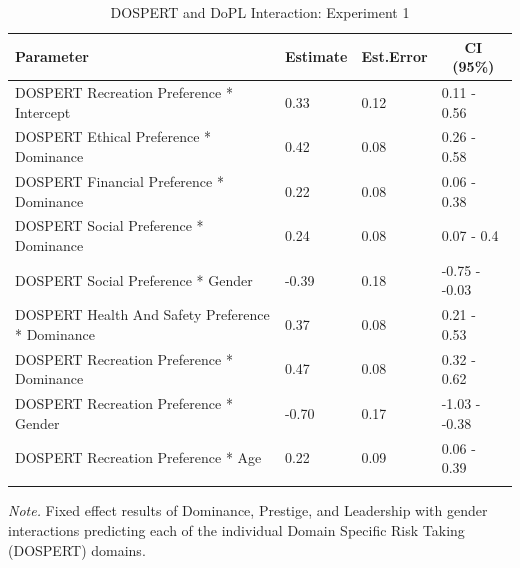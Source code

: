 \documentclass[
  donotrepeattitle,doc, 12pt, a4paper,floatsintext]{apa7}
\begin{document}
\begin{table}[ht]

\begin{center}
\begin{threeparttable}

\caption{\label{tab:m3_exp_1}DOSPERT and DoPL Interaction: Experiment 1}

\small{

\begin{tabular}{llll}
\toprule
Parameter & \multicolumn{1}{c}{Estimate} & \multicolumn{1}{c}{Est.Error} & \multicolumn{1}{c}{CI (95\%)}\\
\midrule
DOSPERT Recreation Preference * Intercept & 0.33 & 0.12 & 0.11 - 0.56\\
DOSPERT Ethical Preference * Dominance & 0.42 & 0.08 & 0.26 - 0.58\\
DOSPERT Financial Preference * Dominance & 0.22 & 0.08 & 0.06 - 0.38\\
DOSPERT Social Preference * Dominance & 0.24 & 0.08 & 0.07 - 0.4\\
DOSPERT Social Preference * Gender & -0.39 & 0.18 & -0.75 - -0.03\\
DOSPERT Health And Safety Preference * Dominance & 0.37 & 0.08 & 0.21 - 0.53\\
DOSPERT Recreation Preference * Dominance & 0.47 & 0.08 & 0.32 - 0.62\\
DOSPERT Recreation Preference * Gender & -0.70 & 0.17 & -1.03 - -0.38\\
DOSPERT Recreation Preference * Age & 0.22 & 0.09 & 0.06 - 0.39\\
\bottomrule
\addlinespace
\end{tabular}

}

\begin{tablenotes}[para]
\normalsize{\textit{Note.} Fixed effect results of Dominance, Prestige, and Leadership with gender interactions predicting each of the individual Domain Specific Risk Taking (DOSPERT) domains.}
\end{tablenotes}

\end{threeparttable}
\end{center}

\end{table}
\end{document}
